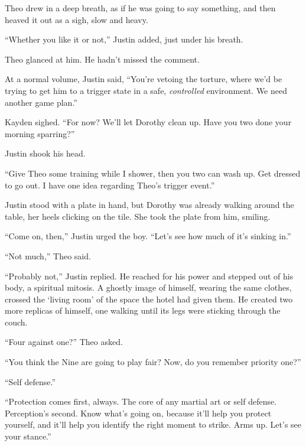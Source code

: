 Theo drew in a deep breath, as if he was going to say something, and then heaved it out as a sigh, slow and heavy.



``Whether you like it or not,'' Justin added, just under his breath.



Theo glanced at him.  He hadn't missed the comment.



At a normal volume, Justin said, ``You're vetoing the torture, where we'd be trying to get him to a trigger state in a safe, \emph{controlled} environment.  We need another game plan.''



Kayden sighed.  ``For now?  We'll let Dorothy clean up.  Have you two done your morning sparring?''



Justin shook his head.



``Give Theo some training while I shower, then you two can wash up.  Get dressed to go out.  I have one idea regarding Theo's trigger event.''



Justin stood with a plate in hand, but Dorothy was already walking around the table, her heels clicking on the tile.  She took the plate from him, smiling.



``Come on, then,'' Justin urged the boy.  ``Let's see how much of it's sinking in.''



``Not much,'' Theo said.



``Probably not,'' Justin replied.  He reached for his power and stepped out of his body, a spiritual mitosis.  A ghostly image of himself, wearing the same clothes, crossed the `living room' of the space the hotel had given them.  He created two more replicas of himself, one walking until its legs were sticking through the couch.



``Four against one?''  Theo asked.



``You think the Nine are going to play fair?  Now, do you remember priority one?''



``Self defense.''



``Protection comes first, always.  The core of any martial art or self defense.  Perception's second.  Know what's going on, because it'll help you protect yourself, and it'll help you identify the right moment to strike.  Arms up.  Let's see your stance.''



